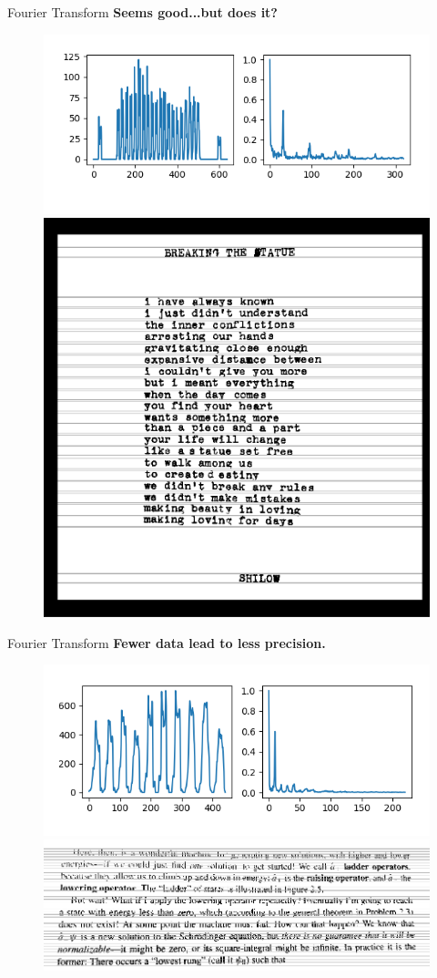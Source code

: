 \documentclass{beamer}
\begin{document}
\begin{frame}{Fourier Transform}
	\textbf{Seems good...but does it?}
		\begin{figure}[H]
			\includegraphics[width=0.45\linewidth]{./fourier.png}
			\includegraphics[width=0.55\linewidth]{./imgslice.png}
		\end{figure}
\end{frame}

\begin{frame}{Fourier Transform}
	\textbf{Fewer data lead to less precision.}
	\begin{figure}[H]
		\includegraphics[width=0.55\linewidth]{./fourier2.png}
		\includegraphics[width=0.70\linewidth]{./imgslice2.png}
	\end{figure}
\end{frame}
\end{document}
